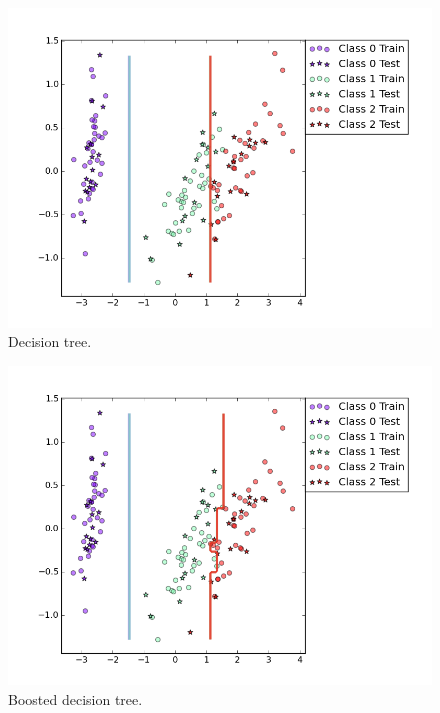 \documentclass[a4paper,10pt]{article}
\begin{document}
\FloatBarrier
\begin{figure}[h!]
  \center
  \includegraphics[width = 150mm]{figure_4.png}
  \vspace{-15mm}

  \begin{minipage}[t]{95mm}
    \caption{
      Decision tree.
    }
    \label{FIGas4}
  \end{minipage}
\end{figure}
\FloatBarrier





\FloatBarrier
\begin{figure}[h!]
  \center
  \includegraphics[width = 150mm]{figure_5.png}
  \vspace{-15mm}

  \begin{minipage}[t]{95mm}
    \caption{
      Boosted decision tree.
    }
    \label{FIGas3}
  \end{minipage}
\end{figure}
\FloatBarrier
\end{document}
